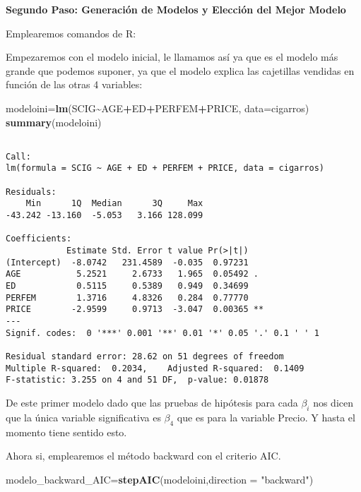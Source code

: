 \documentclass[
  a4paper,
  oneside,
  openany]{book}
\newenvironment{Shaded}{\begin{snugshade}}{\end{snugshade}}
\newcommand{\AttributeTok}[1]{\textcolor[rgb]{0.13,0.29,0.53}{#1}}
\newcommand{\FunctionTok}[1]{\textcolor[rgb]{0.13,0.29,0.53}{\textbf{#1}}}
\newcommand{\NormalTok}[1]{#1}
\newcommand{\OtherTok}[1]{\textcolor[rgb]{0.56,0.35,0.01}{#1}}
\newcommand{\SpecialCharTok}[1]{\textcolor[rgb]{0.81,0.36,0.00}{\textbf{#1}}}
\newcommand{\StringTok}[1]{\textcolor[rgb]{0.31,0.60,0.02}{#1}}
\begin{document}
\textbf{Segundo Paso: Generación de Modelos y Elección del Mejor Modelo}

Emplearemos comandos de R:

Empezaremos con el modelo inicial, le llamamos así ya que es el modelo más grande que podemos suponer, ya que el modelo explica las cajetillas vendidas en función de las otras 4 variables:

\begin{Shaded}
\begin{Highlighting}[]
\NormalTok{modeloini}\OtherTok{=}\FunctionTok{lm}\NormalTok{(SCIG}\SpecialCharTok{\textasciitilde{}}\NormalTok{AGE}\SpecialCharTok{+}\NormalTok{ED}\SpecialCharTok{+}\NormalTok{PERFEM}\SpecialCharTok{+}\NormalTok{PRICE, }\AttributeTok{data=}\NormalTok{cigarros) }
\FunctionTok{summary}\NormalTok{(modeloini)}
\end{Highlighting}
\end{Shaded}

\begin{verbatim}

Call:
lm(formula = SCIG ~ AGE + ED + PERFEM + PRICE, data = cigarros)

Residuals:
    Min      1Q  Median      3Q     Max 
-43.242 -13.160  -5.053   3.166 128.099 

Coefficients:
            Estimate Std. Error t value Pr(>|t|)   
(Intercept)  -8.0742   231.4589  -0.035  0.97231   
AGE           5.2521     2.6733   1.965  0.05492 . 
ED            0.5115     0.5389   0.949  0.34699   
PERFEM        1.3716     4.8326   0.284  0.77770   
PRICE        -2.9599     0.9713  -3.047  0.00365 **
---
Signif. codes:  0 '***' 0.001 '**' 0.01 '*' 0.05 '.' 0.1 ' ' 1

Residual standard error: 28.62 on 51 degrees of freedom
Multiple R-squared:  0.2034,    Adjusted R-squared:  0.1409 
F-statistic: 3.255 on 4 and 51 DF,  p-value: 0.01878
\end{verbatim}

De este primer modelo dado que las pruebas de hipótesis para cada \(\beta_{i}\) nos dicen que la única variable significativa es \(\beta_{4}\) que es para la variable Precio. Y hasta el momento tiene sentido esto.

Ahora si, emplearemos el método backward con el criterio AIC.

\begin{Shaded}
\begin{Highlighting}[]
\NormalTok{modelo\_backward\_AIC}\OtherTok{=}\FunctionTok{stepAIC}\NormalTok{(modeloini,}\AttributeTok{direction =} \StringTok{"backward"}\NormalTok{)}
\end{Highlighting}
\end{Shaded}
\end{document}
